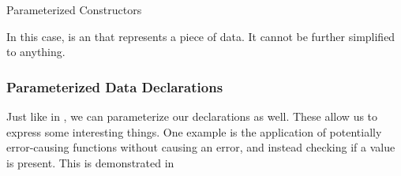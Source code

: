 \begin{listing}[h!tbp]
\caption{Parameterized Constructors}
\label{lst:Data_Declaration-Parameterized_Constructors}
\end{listing}

In this case,  is an  that represents a piece of data.
It cannot be further simplified to anything.

\subsubsection{Parameterized Data Declarations}\label{subsubsec:Parameterized_Data_Declarations}
Just like in , we can parameterize our  declarations as well.
These allow us to express some interesting things.
One example is the application of potentially error-causing functions without causing an error, and instead checking if a value is present.
This is demonstrated in 



